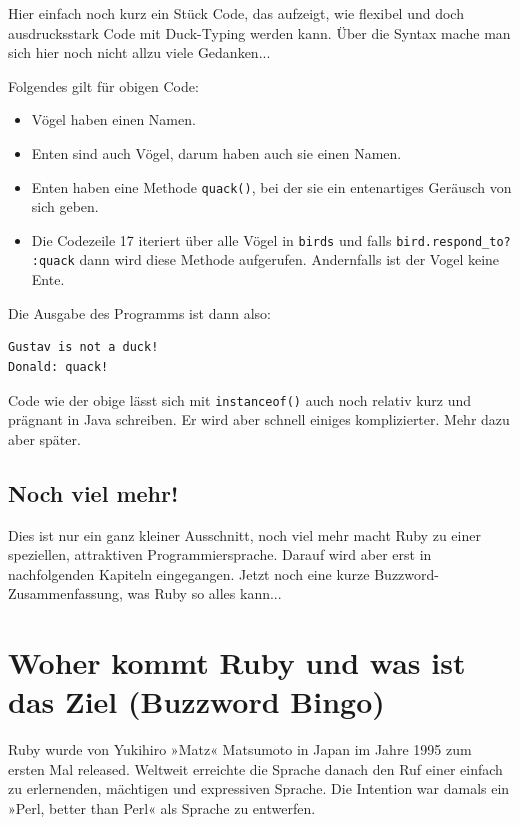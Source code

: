 \documentclass[a4book,11pt,twoside]{scrbook}
\begin{document}
Hier einfach noch kurz ein Stück Code, das aufzeigt, wie flexibel und doch ausdrucksstark Code mit Duck-Typing werden kann. Über die Syntax mache man sich hier noch nicht allzu viele Gedanken...



Folgendes gilt für obigen Code:
\begin{itemize}
	\item Vögel haben einen Namen.
	\item Enten sind auch Vögel, darum haben auch sie einen Namen.
	\item Enten haben eine Methode \texttt{quack()}, bei der sie ein entenartiges Geräusch von sich geben.
	\item Die Codezeile 17 iteriert über alle Vögel in \texttt{birds} und falls \texttt{bird.respond\_to? :quack} dann wird diese Methode aufgerufen. Andernfalls ist der Vogel keine Ente.
\end{itemize}

Die Ausgabe des Programms ist dann also:

\begin{lstlisting}
Gustav is not a duck!
Donald: quack!
\end{lstlisting}

Code wie der obige lässt sich mit \texttt{instanceof()} auch noch relativ kurz und prägnant in Java schreiben. Er wird aber schnell einiges komplizierter. Mehr dazu aber später.



\subsection*{Noch viel mehr!} %
\label{sub:noch_viel_mehr_}
Dies ist nur ein ganz kleiner Ausschnitt, noch viel mehr macht Ruby zu einer speziellen, attraktiven Programmiersprache. Darauf wird aber erst in nachfolgenden Kapiteln eingegangen. Jetzt noch eine kurze Buzzword-Zusammenfassung, was Ruby so alles kann...




\section{Woher kommt Ruby und was ist das Ziel (Buzzword Bingo)} %
\label{sec:woher_kommt_ruby_und_was_ist_das_ziel}
Ruby wurde von Yukihiro »Matz« Matsumoto in Japan im Jahre 1995 zum ersten Mal released. Weltweit erreichte die Sprache danach den Ruf einer einfach zu erlernenden, mächtigen und expressiven Sprache.
Die Intention war damals ein »Perl, better than Perl« als Sprache zu entwerfen.
\end{document}
